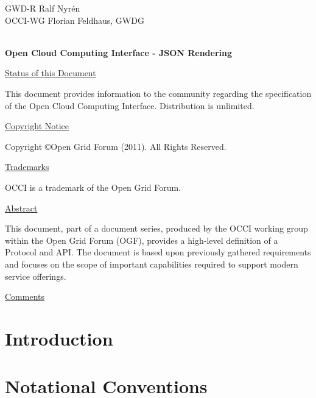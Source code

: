 \documentclass[10pt,a4paper]{article}
\begin{document}
\thispagestyle{empty}

GWD-R \hfill Ralf Nyrén \\
OCCI-WG \hfill Florian Feldhaus, GWDG\\
\\

\vspace*{0.5in}

\begin{Large}
\textbf{Open Cloud Computing Interface - JSON Rendering}
\end{Large}

\vspace*{0.5in}

\underline{Status of this Document}

This document provides information to the community regarding the
specification of the Open Cloud Computing Interface. Distribution is
unlimited.

\underline{Copyright Notice}

Copyright \copyright Open Grid Forum (2011). All Rights Reserved.

\underline{Trademarks}

OCCI is a trademark of the Open Grid Forum.

\underline{Abstract}

This document, part of a document series, produced by the OCCI working
group within the Open Grid Forum (OGF), provides a high-level
definition of a Protocol and API. The document is based upon
previously gathered requirements and focuses on the scope of important
capabilities required to support modern service offerings.

\underline{Comments}
\newcommand{\ralf}[1]{\textcolor{red}{RN: #1}}

\newpage
\tableofcontents
\newpage

\section{Introduction}
%

\section{Notational Conventions}


%
\end{document}
